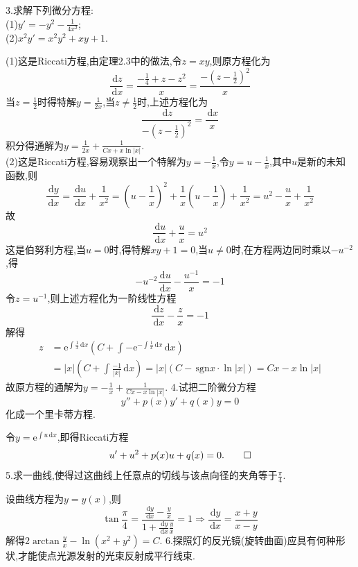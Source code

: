 \documentclass[titlepage,11pt,a4paper,twoside]{report}
\makeatletter
\newcommand\diff{\,\mathrm{d}}
\newcommand\sgn{\,\mathrm{sgn}}
\newcommand\e{\mathrm{e}}
\newenvironment{solve}{\par
	\pushQED{\qed}%
	\normalfont \topsep1\p@\@plus6\p@\relax
	\trivlist
	\item\relax
	{\hspace*{\parindent}{\heiti 解}\@addpunct{:}}\hspace\labelsep\ignorespaces
}{%
	\popQED\endtrivlist\@endpefalse
}
\makeatother
\begin{document}
3.求解下列微分方程:\\
(1)$\displaystyle y'=-y^2-\frac{1}{4x^2}$;\\
(2)$\displaystyle x^2y'=x^2y^2+xy+1$.
\begin{solve}
(1)这是Riccati方程,由定理2.3中的做法,令$z=xy$,则原方程化为
\[\frac{\diff z}{\diff x}=\frac{-\frac{1}{4}+z-z^2}{x}=\frac{-\left(z-\frac{1}{2}\right)^2}{x}\]
当$z=\frac{1}{2}$时得特解$y=\frac{1}{2x}$,当$z\neq\frac{1}{2}$时,上述方程化为
\[\frac{\diff z}{-\left(z-\frac{1}{2}\right)^2}=\frac{\diff x}{x}\]
积分得通解为$y=\frac{1}{2x}+\frac{1}{Cx+x\ln|x|}$.\\
(2)这是Riccati方程,容易观察出一个特解为$y=-\frac{1}{x}$,令$y=u-\frac{1}{x}$,其中$u$是新的未知函数,则
\[\frac{\diff y}{\diff x}=\frac{\diff u}{\diff x}+\frac{1}{x^2}=\left(u-\frac{1}{x}\right)^2+\frac{1}{x}\left(u-\frac{1}{x}\right)+\frac{1}{x^2}=u^2-\frac{u}{x}+\frac{1}{x^2}\]
故
\[\frac{\diff u}{\diff x}+\frac{u}{x}=u^2\]
这是伯努利方程,当$u=0$时,得特解$xy+1=0$,当$u\neq0$时,在方程两边同时乘以$-u^{-2}$,得
\[-u^{-2}\frac{\diff u}{\diff x}-\frac{u^{-1}}{x}=-1\]
令$z=u^{-1}$,则上述方程化为一阶线性方程
\[\frac{\diff z}{\diff x}-\frac{z}{x}=-1\]
解得
\[\begin{split}
z&=\e^{\int\frac{1}{x}\diff x}\left(C+\int-\e^{-\int\frac{1}{x}\diff x}\diff x\right)\\
&=|x|\left(C+\int\frac{-1}{|x|}\diff x\right)=|x|\left(C-\sgn x\cdot\ln|x|\right)=Cx-x\ln|x|
\end{split}\]
故原方程的通解为$y=-\frac{1}{x}+\frac{1}{Cx-x\ln|x|}$.
\end{solve}
4.试把二阶微分方程
\[y''+p(x)y'+q(x)y=0\]
化成一个里卡蒂方程.
\begin{solve}
令$y=\e^{\int u\diff x}$,即得Riccati方程
\[u'+u^2+p(x)u+q(x)=0.\qedhere\]
\end{solve}
5.求一曲线,使得过这曲线上任意点的切线与该点向径的夹角等于$\frac{\pi}{4}$.
\begin{solve}
设曲线方程为$y=y(x)$,则
\[\tan\frac{\pi}{4}=\frac{\frac{\diff y}{\diff x}-\frac{y}{x}}{1+\frac{\diff y}{\diff x}\frac{y}{x}}=1\Rightarrow\frac{\diff y}{\diff x}=\frac{x+y}{x-y}\]
解得$2\arctan\frac{y}{x}-\ln(x^2+y^2)=C$.
\end{solve}
6.探照灯的反光镜(旋转曲面)应具有何种形状,才能使点光源发射的光束反射成平行线束.
\end{document}
